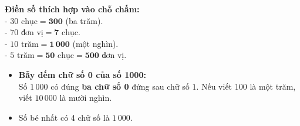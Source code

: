 \documentclass[11pt,a4paper]{article}
\begin{document}
\vspace{-1.5mm}
\noindent
\begin{minipage}[t]{0.49\textwidth}\vspace{0pt}
\begin{tcolorbox}[
  enhanced,
  colback=green!4!white,
  colframe=green!60!black,
  arc=2mm, boxrule=0.8pt,
  left=2mm, right=2mm, top=1.8mm, bottom=1.8mm,
  title={\footnotesize\bfseries\color{white}\faCheckCircle\ 4. Ví dụ thực hành chuẩn mực}
]
{\footnotesize
\textbf{Điền số thích hợp vào chỗ chấm:}\\
- $30\text{ chục} = \mathbf{300}$ (ba trăm).\\
- $70\text{ đơn vị} = \mathbf{7}\text{ chục}$.\\
- $10\text{ trăm} = \mathbf{1\,000}$ (một nghìn).\\
- $5\text{ trăm} = \mathbf{50}\text{ chục} = \mathbf{500}\text{ đơn vị}$.
}
\end{tcolorbox}
\end{minipage}
\hfill
\begin{minipage}[t]{0.49\textwidth}\vspace{0pt}
\begin{tcolorbox}[
  enhanced,
  colback=red!4!white,
  colframe=red!75!black,
  arc=2mm, boxrule=0.8pt,
  left=2mm, right=2mm, top=1.8mm, bottom=1.8mm,
  title={\footnotesize\bfseries\color{white}\faExclamationTriangle\ 5. Mẹo tránh bẫy trắc nghiệm}
]
{\footnotesize
\begin{itemize}\setlength{\itemsep}{1pt}\setlength{\leftskip}{-2.5mm}
  \item \textbf{Bẫy đếm chữ số 0 của số 1000:}\\
  Số $1\,000$ có đúng \textbf{ba chữ số 0} đứng sau chữ số $1$. Nếu viết $100$ là một trăm, viết $10\,000$ là mười nghìn.
  \item Số bé nhất có 4 chữ số là $1\,000$.
\end{itemize}
}
\end{tcolorbox}
\end{minipage}
\end{document}
